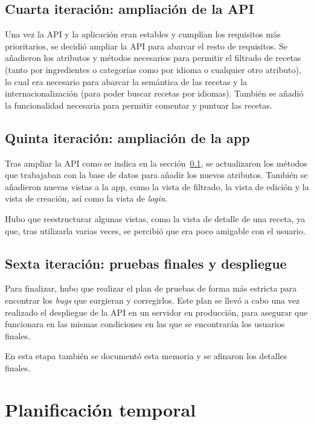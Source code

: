 \subsection{Cuarta iteración: ampliación de la API}
\label{sec:cuarta_iteracion}

Una vez la API y la aplicación eran estables y cumplían los requisitos más
prioritarios, se decidió ampliar la API para abarcar el resto de requisitos. Se
añadieron los atributos y métodos necesarios para permitir el filtrado de recetas
(tanto por ingredientes o categorías como por idioma o cualquier otro atributo),
lo cual era necesario para abarcar la semántica de las recetas y la
internacionalización (para poder buscar recetas por idiomas). También se añadió
la funcionalidad necesaria para permitir comentar y puntuar las recetas.


\subsection{Quinta iteración: ampliación de la app}
\label{sec:quinta_iteracion}

Tras ampliar la API como se indica en la sección~\ref{sec:cuarta_iteracion},
se actualizaron los métodos que trabajaban con la base de datos para añadir
los nuevos atributos. También se añadieron nuevas vistas a la app, como la vista
de filtrado, la vista de edición y la vista de creación, así como la vista de
\textit{login}.

Hubo que reestructurar algunas vistas, como la vista de detalle de una receta,
ya que, tras utilizarla varias veces, se percibió que era poco amigable con el
usuario.

\subsection{Sexta iteración: pruebas finales y despliegue}
\label{sec:sexta_iteracion}

Para finalizar, hubo que realizar el plan de pruebas de forma más estricta para
encontrar los \textit{bugs} que surgieran y corregirlos. Este plan se llevó a
cabo una vez realizado el despliegue de la API en un servidor en producción, para
asegurar que funcionara en las mismas condiciones en las que se encontrarán los
usuarios finales.

En esta etapa también se documentó esta memoria y se afinaron los detalles
finales.


\section{Planificación temporal}
\label{sec:planificacion}

